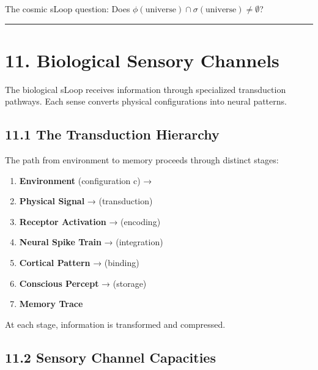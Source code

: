\documentclass[
  11pt,
  letterpaper,
  twoside,
  openany]{book}
\makeatletter
\providecommand{\tightlist}{%
  \setlength{\itemsep}{0pt}\setlength{\parskip}{0pt}}
\let\orig@section\section
\renewcommand{\section}{\needspace{8\baselineskip}\orig@section}
\let\orig@subsection\subsection
\renewcommand{\subsection}{\needspace{6\baselineskip}\orig@subsection}
\makeatother
\begin{document}
The cosmic sLoop question: Does
\(\phi(\text{universe}) \cap \sigma(\text{universe}) \neq \emptyset\)?

\begin{center}\rule{0.5\linewidth}{0.5pt}\end{center}

\section{11. Biological Sensory
Channels}\label{biological-sensory-channels}

The biological sLoop receives information through specialized
transduction pathways. Each sense converts physical configurations into
neural patterns.

\subsection{11.1 The Transduction
Hierarchy}\label{the-transduction-hierarchy}

The path from environment to memory proceeds through distinct stages:

\begin{enumerate}
\def\labelenumi{\arabic{enumi}.}
\tightlist
\item
  \textbf{Environment} (configuration c) →
\item
  \textbf{Physical Signal} → (transduction)
\item
  \textbf{Receptor Activation} → (encoding)
\item
  \textbf{Neural Spike Train} → (integration)
\item
  \textbf{Cortical Pattern} → (binding)
\item
  \textbf{Conscious Percept} → (storage)
\item
  \textbf{Memory Trace}
\end{enumerate}

At each stage, information is transformed and compressed.

\subsection{11.2 Sensory Channel
Capacities}\label{sensory-channel-capacities}
\end{document}
